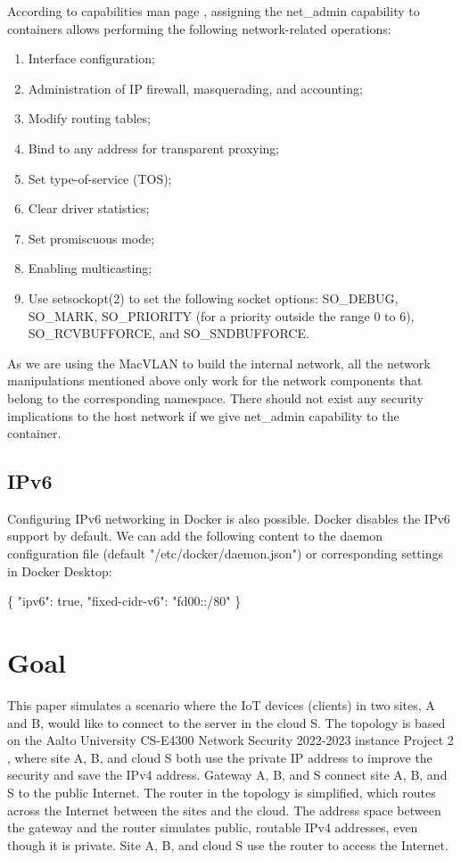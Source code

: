 \documentclass[article]{aaltoseries}
\begin{document}
According to capabilities man page \cite{capabilities}, assigning the net\_admin capability to containers allows performing the following network-related operations:
\begin{enumerate}
\setlength{\itemsep}{0pt}
\setlength{\parsep}{0pt}
\setlength{\parskip}{0pt}
\item Interface configuration;
\item Administration of IP firewall, masquerading, and accounting;
\item Modify routing tables;
\item Bind to any address for transparent proxying;
\item Set type-of-service (TOS);
\item Clear driver statistics;
\item Set promiscuous mode;
\item Enabling multicasting;
\item Use setsockopt(2) to set the following socket options:
SO\_DEBUG, SO\_MARK, SO\_PRIORITY (for a priority outside the
range 0 to 6), SO\_RCVBUFFORCE, and SO\_SNDBUFFORCE.
\end{enumerate}

As we are using the MacVLAN to build the internal network, all the network manipulations mentioned above only work for the network components that belong to the corresponding namespace. There should not exist any security implications to the host network if we give net\_admin capability to the container.

\subsection{IPv6}
Configuring IPv6 networking in Docker \cite{docker_documentation_ipv6_2023} is also possible. Docker disables the IPv6 support by default. We can add the following content to the daemon configuration file (default "/etc/docker/daemon.json") or corresponding settings in Docker Desktop:

\{
  "ipv6": true,
  "fixed-cidr-v6": "fd00::/80"
\}



\section{Goal}

This paper simulates a scenario where the IoT devices (clients) in two sites, A and B, would like to connect to the server in the cloud S. The topology is based on the Aalto University CS-E4300 Network Security 2022-2023 instance Project 2 \cite{aura_peltonen_bui_2022}, where site A, B, and cloud S both use the private IP address to improve the security and save the IPv4 address. Gateway A, B, and S connect site A, B, and S to the public Internet. The router in the topology is simplified, which routes across the Internet between the sites and the cloud. The address space between the gateway and the router simulates public, routable IPv4 addresses, even though it is private. Site A, B, and cloud S use the router to access the Internet.
\end{document}
